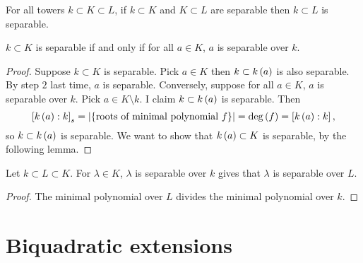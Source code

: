 \begin{corollary}
For all towers $ k \subset K \subset L $, if $ k \subset K $ and $ K \subset L $ are separable then $ k \subset L $ is separable.
\end{corollary}

\begin{corollary}
$ k \subset K $ is separable if and only if for all $ a \in K $, $ a $ is separable over $ k $.
\end{corollary}

\begin{proof}
Suppose $ k \subset K $ is separable. Pick $ a \in K $ then $ k \subset k\left( a \right) $ is also separable. By step $ 2 $ last time, $ a $ is separable. Conversely, suppose for all $ a \in K $, $ a $ is separable over $ k $. Pick $ a \in K \setminus k $. I claim $ k \subset k\left( a \right) $ is separable. Then
$$ \left[ k\left( a \right) : k \right]_s = \left\lvert \left\{ \text{roots of minimal polynomial} \ f \right\} \right\rvert = \deg\left( f \right) = \left[ k\left( a \right) : k \right], $$
so $ k \subset k\left( a \right) $ is separable. We want to show that $ k\left( a \right) \subset K $ is separable, by the following lemma.
\end{proof}

\begin{lemma}
Let $ k \subset L \subset K $. For $ \lambda \in K $, $ \lambda $ is separable over $ k $ gives that $ \lambda $ is separable over $ L $.
\end{lemma}

\begin{proof}
The minimal polynomial over $ L $ divides the minimal polynomial over $ k $.
\end{proof}

\pagebreak

\section{Biquadratic extensions}

